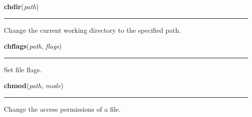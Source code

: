     \label{os:chdir}

    \vspace{0.5ex}

\hspace{.8\funcindent}\begin{boxedminipage}{\funcwidth}

    \raggedright \textbf{chdir}(\textit{path})

    \vspace{-1.5ex}

    \rule{\textwidth}{0.5\fboxrule}
\setlength{\parskip}{2ex}
    Change the current working directory to the specified path.

\setlength{\parskip}{1ex}
    \end{boxedminipage}

    \label{os:chflags}

    \vspace{0.5ex}

\hspace{.8\funcindent}\begin{boxedminipage}{\funcwidth}

    \raggedright \textbf{chflags}(\textit{path}, \textit{flags})

    \vspace{-1.5ex}

    \rule{\textwidth}{0.5\fboxrule}
\setlength{\parskip}{2ex}
    Set file flags.

\setlength{\parskip}{1ex}
    \end{boxedminipage}

    \label{os:chmod}

    \vspace{0.5ex}

\hspace{.8\funcindent}\begin{boxedminipage}{\funcwidth}

    \raggedright \textbf{chmod}(\textit{path}, \textit{mode})

    \vspace{-1.5ex}

    \rule{\textwidth}{0.5\fboxrule}
\setlength{\parskip}{2ex}
    Change the access permissions of a file.

\setlength{\parskip}{1ex}
    \end{boxedminipage}

    \label{os:chown}

